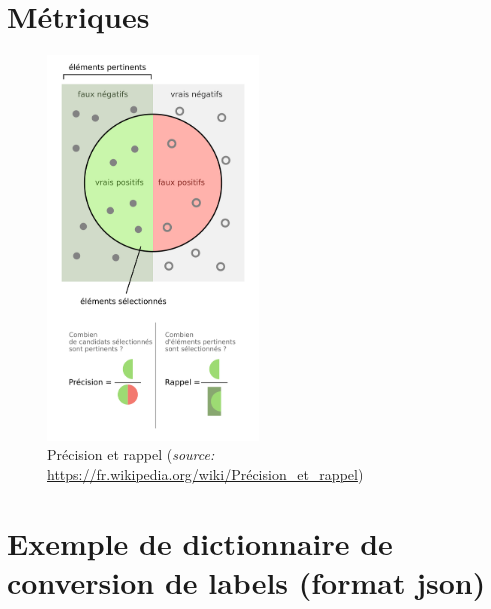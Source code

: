 \chapter{Métriques}

\begin{figure}[h]
    \label{precision_recall}
    \centering
    \includegraphics[width=0.5\textwidth]{./img/precision_recall.png}
    \caption{Précision et rappel (\textit{source:} \url{https://fr.wikipedia.org/wiki/Précision_et_rappel})}
\end{figure}

\pagebreak

\chapter{Exemple de dictionnaire de conversion de labels (format json)}

